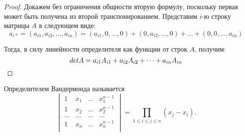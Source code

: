 \begin{proof}
	Докажем без ограничения общности вторую формулу, поскольку первая может быть получена из второй транспонированием. Представим $i$-ю строку матрицы $A$ в следующем виде:
	\[a_{i*} = (a_{i1}, a_{i2}, \dots, a_{in}) = (a_{i1}, 0, \dots, 0) + (0, a_{i2}, \dots, 0) + \dots + (0, 0, \dots, a_{in})\]
	
	Тогда, в силу линейности определителя как функции от строк $A$, получим:
	\[det{A} = a_{i1}A_{i1} + a_{i2}A_{i2} + \dots + a_{in}A_{in}\qedhere\]
\end{proof}

\begin{theorem}
    Определителем Вандермонда называется
    \[\begin{vmatrix}
    1 & x_1 & ... & x_{1}^{n-1} \\
    1 & x_2 & ... & x_{2}^{n-1} \\
    ... & ... & ... & ... \\
    1 & x_n & ... & x_{n}^{n-1} \\
    \end{vmatrix} = \prod_{1 \leq i \leq j \leq n} (x_j - x_i).\]
\end{theorem}

